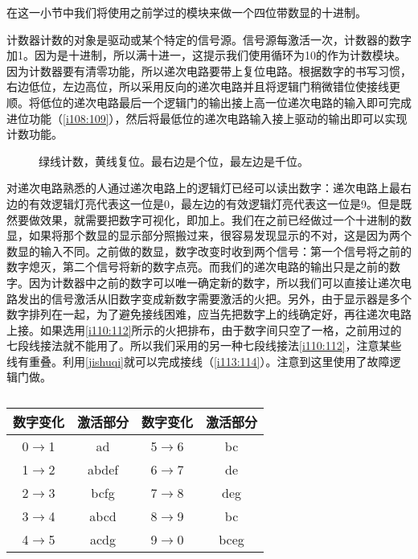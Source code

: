 在这一小节中我们将使用之前学过的模块来做一个四位带数显的十进制。

计数器计数的对象是驱动或某个特定的信号源。信号源每激活一次，计数器的数字加1。因为是十进制，所以满十进一，这提示我们使用循环为10的作为计数模块。因为计数器要有清零功能，所以递次电路要带上复位电路。根据数字的书写习惯，右边低位，左边高位，所以采用反向的递次电路并且将逻辑门稍微错位使接线更顺。将低位的递次电路最后一个逻辑门的输出接上高一位递次电路的输入即可完成进位功能（\autoref{i108:109}），然后将最低位的递次电路输入接上驱动的输出即可以实现计数功能。

\begin{figure}[!ht]
\centering
{}

\caption{绿线计数，黄线复位。最右边是个位，最左边是千位。}
\label{i108:109}
\end{figure}

对递次电路熟悉的人通过递次电路上的逻辑灯已经可以读出数字：递次电路上最右边的有效逻辑灯亮代表这一位是0，最左边的有效逻辑灯亮代表这一位是9。但是既然要做效果，就需要把数字可视化，即加上。我们在之前已经做过一个十进制的数显，如果将那个数显的显示部分照搬过来，很容易发现显示的不对，这是因为两个数显的输入不同。之前做的数显，数字改变时收到两个信号：第一个信号将之前的数字熄灭，第二个信号将新的数字点亮。而我们的递次电路的输出只是之前的数字。因为计数器中之前的数字可以唯一确定新的数字，所以我们可以直接让递次电路发出的信号激活从旧数字变成新数字需要激活的火把。另外，由于显示器是多个数字排列在一起，为了避免接线困难，应当先把数字上的线确定好，再往递次电路上接。如果选用\autoref{i110:112}所示的火把排布，由于数字间只空了一格，之前用过的七段线接法就不能用了。所以我们采用的另一种七段线接法\autoref{i110:112}，注意某些线有重叠。利用\autoref{jishuqi}就可以完成接线（\autoref{i113:114}）。注意到这里使用了故障逻辑门做。

\begin{figure}[!ht]
\centering
{}%
%
\caption{}
\label{i110:112}
\end{figure}

\begin{table}[!ht]
\centering
\begin{tabular}{|cc||cc|}
\hline
数字变化&激活部分&数字变化&激活部分\\\hline
0$\to$1&ad&5$\to$6&bc\\
1$\to$2&abdef&6$\to$7&de\\
2$\to$3&bcfg&7$\to$8&deg\\
3$\to$4&abcd&8$\to$9&bc\\
4$\to$5&acdg&9$\to$0&bceg\\\hline
\end{tabular}
\caption{}
\label{jishuqi}
\end{table}

